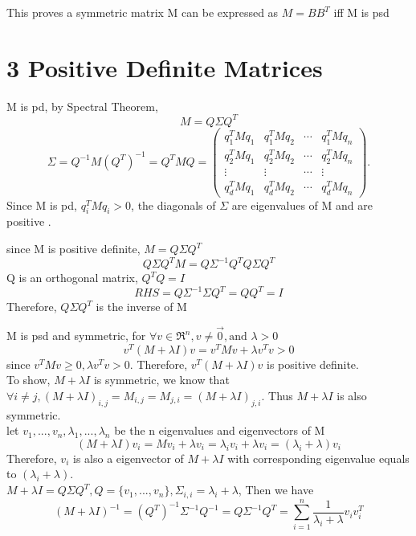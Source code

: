 \documentclass{article}
\newenvironment{sub}[2][$-$]{\begin{trivlist}
		\item[\hskip \labelsep {\bfseries #1}\hskip \labelsep {\bfseries #2.}]}  {\end{trivlist}}
\begin{document}
 This proves a symmetric matrix M can be expressed as $M = BB^T$ iff M is psd
 
 \section{3 Positive Definite Matrices}
 
 \begin{sub}{3.1}
 \end{sub}
 M is pd, by Spectral Theorem, $$M = Q\Sigma Q^T$$
 $$\Sigma  = Q^{-1} M(Q^{T})^{-1} = Q^TMQ = 
 \begin{pmatrix}q_{1}^{T}Mq_{1} & q_{1}^{T}Mq_{2} & \cdots & q_{1}^{T}Mq_{n}\\
 q_{2}^{T}Mq_{1} & q_{2}^{T}Mq_{2} & \cdots & q_{2}^{T}Mq_{n}\\
 \vdots & \vdots & \cdots & \vdots\\
 q_{d}^{T}Mq_{1} & q_{d}^{T}Mq_{2} & \cdots & q_{d}^{T}Mq_{n}
 \end{pmatrix}.
 $$ Since M is pd, $q_i^TMq_i > 0$, the diagonals of $\Sigma$ are eigenvalues of M and are positive . 

\pagebreak

\begin{sub}{3.2}
\end{sub}
since M is positive definite, $M = Q\Sigma Q^T$
$$Q\Sigma Q^{T} M = Q\Sigma^{-1} Q^T Q\Sigma Q^T$$
Q is an orthogonal matrix, $Q^TQ = I$ 
$$ RHS = Q\Sigma^{-1} \Sigma  Q^T = QQ^T = I $$
Therefore, $Q\Sigma Q^{T}$ is the inverse of M

\begin{sub}{3.3}
\end{sub}

M is psd and symmetric, for $\forall  v \in \Re^n ,v \neq \vec{0}, \text{and } \lambda >0$
$$v^T(M+\lambda I ) v = v^TMv + \lambda v^Tv > 0$$
since $v^TMv \geq 0, \lambda v^Tv > 0$. Therefore, $v^T(M+\lambda I ) v$ is positive definite. \\
To show, $M+\lambda I  $ is symmetric, we know that $\forall i \neq j, (M+\lambda I )_{i,j} = M_{i,j} = M_{j,i} = (M+\lambda I )_{j,i}$. Thus $M+\lambda I  $  is also symmetric. \\

let $v_1,...,v_n, \lambda_1, ..., \lambda_n$ be the n eigenvalues and  eigenvectors of M 
$$ (M+\lambda I ) v_i = Mv_i + \lambda v_i = \lambda_i v_i + \lambda v_i  = (\lambda_i + \lambda) v_i$$
Therefore, $v_i$ is also a eigenvector of $M+\lambda I$ with corresponding eigenvalue equals to $(\lambda_i + \lambda)$.\\
$M+\lambda I  = Q\Sigma Q^T, Q = \{v_1,...,v_n\}, \Sigma_{i,i} = \lambda_i + \lambda$, Then we have 
$$(M+\lambda I )^{-1} = (Q^T)^{-1} \Sigma^{-1} Q^{-1} = Q \Sigma^{-1} Q^T = \sum_{i=1}^{n} \frac{1}{\lambda_i+\lambda} v_iv_i^T$$
\end{document}
